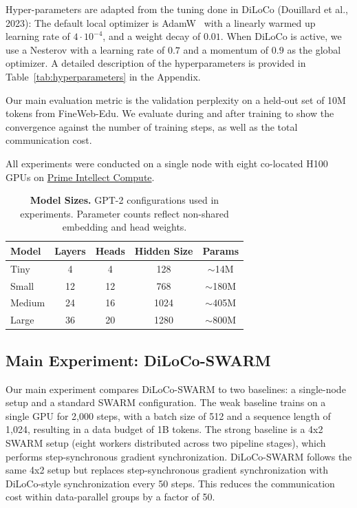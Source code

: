 \documentclass{article}
\begin{document}
Hyper-parameters are adapted from the tuning done in DiLoCo (Douillard et al., 2023): The default local optimizer is AdamW~\cite{loshchilov2019adamw} with a linearly warmed up learning rate of $4\cdot10^{-4}$, and a weight decay of $0.01$. When DiLoCo is active, we use a Nesterov
with a learning rate of $0.7$ and a momentum of $0.9$ as the global optimizer. A detailed description of the hyperparameters is provided in Table~\ref{tab:hyperparameters} in the Appendix.

Our main evaluation metric is the validation perplexity on a held-out set of 10M tokens from FineWeb-Edu. We evaluate during and after training to show the convergence against the number of training steps, as well as the total communication cost.

All experiments were conducted on a single node with eight co-located H100 GPUs
on \href{https://app.primeintellect.com/}{Prime Intellect Compute}.

\begin{table}[h]
\centering
\begin{tabular}{lcccc}
\toprule
\textbf{Model} & \textbf{Layers} & \textbf{Heads} & \textbf{Hidden Size} & \textbf{Params} \\
\midrule
Tiny & 4 & 4 & 128 & $\sim$14M \\
Small & 12 & 12 & 768 & $\sim$180M \\
Medium & 24 & 16 & 1024 & $\sim$405M \\
Large & 36 & 20 & 1280 & $\sim$800M \\
\bottomrule
\end{tabular}
\caption{\textbf{Model Sizes.} GPT-2 configurations used in experiments. Parameter counts reflect non-shared embedding and head weights.}
\label{tab:models}
\end{table}

\subsection{Main Experiment: DiLoCo-SWARM}

Our main experiment compares DiLoCo-SWARM to two baselines: a single-node setup and a standard SWARM configuration. The weak baseline trains on a single GPU for 2,000 steps, with a batch size of 512 and a sequence length of 1,024, resulting in a data budget of 1B tokens. The strong baseline is a 4x2 SWARM setup (eight workers distributed across two pipeline stages), which performs step-synchronous gradient synchronization. DiLoCo-SWARM follows the same 4x2 setup but replaces step-synchronous gradient synchronization with DiLoCo-style synchronization every 50 steps. This reduces the communication cost within data-parallel groups by a factor of 50.
\end{document}
